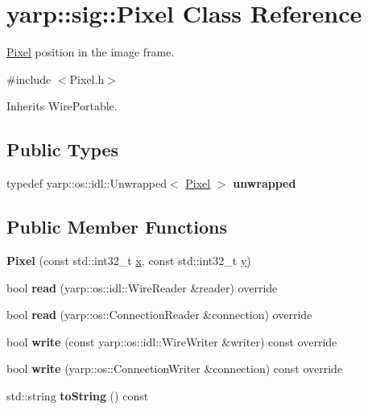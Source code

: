 \section{yarp\+:\+:sig\+:\+:Pixel Class Reference}
\label{classyarp_1_1sig_1_1Pixel}


\hyperlink{classyarp_1_1sig_1_1Pixel}{Pixel} position in the image frame.  




{\ttfamily \#include $<$Pixel.\+h$>$}



Inherits Wire\+Portable.

\subsection*{Public Types}
\begin{DoxyCompactItemize}
\item 
\mbox{\label{classyarp_1_1sig_1_1Pixel_abf57dca4d33df52fd1bff703ead08252}} 
typedef yarp\+::os\+::idl\+::\+Unwrapped$<$ \hyperlink{classyarp_1_1sig_1_1Pixel}{Pixel} $>$ {\bfseries unwrapped}
\end{DoxyCompactItemize}
\subsection*{Public Member Functions}
\begin{DoxyCompactItemize}
\item 
\mbox{\label{classyarp_1_1sig_1_1Pixel_aa0a1a65247fae9dbe0e7589d87c111bb}} 
{\bfseries Pixel} (const std\+::int32\+\_\+t \hyperlink{classyarp_1_1sig_1_1Pixel_ad3071410597bc7271a53b7df7bc796fc}{x}, const std\+::int32\+\_\+t \hyperlink{classyarp_1_1sig_1_1Pixel_a603768ad1ecf291c12d2f56e0828625c}{y})
\item 
\mbox{\label{classyarp_1_1sig_1_1Pixel_ad8f9c81dd683b06070031fc1eb0858d2}} 
bool {\bfseries read} (yarp\+::os\+::idl\+::\+Wire\+Reader \&reader) override
\item 
\mbox{\label{classyarp_1_1sig_1_1Pixel_aa656813c4239303040dbbc6f16571a0a}} 
bool {\bfseries read} (yarp\+::os\+::\+Connection\+Reader \&connection) override
\item 
\mbox{\label{classyarp_1_1sig_1_1Pixel_aaa84a2bdc7c3bf6efbcbc0ddf44bf114}} 
bool {\bfseries write} (const yarp\+::os\+::idl\+::\+Wire\+Writer \&writer) const override
\item 
\mbox{\label{classyarp_1_1sig_1_1Pixel_afbd07d62192ed95934472c120365bd00}} 
bool {\bfseries write} (yarp\+::os\+::\+Connection\+Writer \&connection) const override
\item 
\mbox{\label{classyarp_1_1sig_1_1Pixel_a1732e1f91e28152c3b8d4935b562a4ef}} 
std\+::string {\bfseries to\+String} () const
\end{DoxyCompactItemize}
